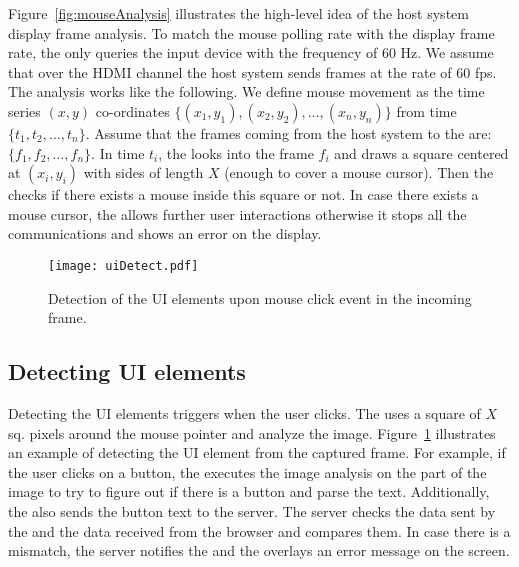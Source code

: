 Figure~\ref{fig:mouseAnalysis} illustrates the high-level idea of the host system display frame analysis. To match the mouse polling rate with the display frame rate, the \device only queries the input device with the frequency of $60$ Hz. We assume that over the HDMI channel the host system sends frames at the rate of $60$ fps. The analysis works like the following. We define mouse movement as the time series $(x,y)$ co-ordinates $\{(x_1,y_1), (x_2, y_2), \ldots, (x_n,y_n)\}$ from time $\{t_1, t_2, \ldots, t_n\}$. Assume that the frames coming from the host system to the \device are: $\{f_1, f_2, \ldots, f_n\}$. In time $t_i$, the \device looks into the frame $f_i$ and draws a square centered at $(x_i, y_i)$ with sides of length $X$ (enough to cover a mouse cursor). Then the \device checks if there exists a mouse inside this square or not. In case there exists a mouse cursor, the \device allows further user interactions otherwise it stops all the communications and shows an error on the display.

\begin{figure}[t]
\centering
\texttt{[image: uiDetect.pdf]}
\caption{Detection of the UI elements upon mouse click event in the incoming frame.}
\label{fig:uiDetect}
\centering
\end{figure}





\subsection{Detecting UI elements}
\label{sec:systemnDesign:uiElements}

Detecting the UI elements triggers when the user clicks. The \device uses a square of $X$ sq. pixels around the mouse pointer and analyze the image. Figure~\ref{fig:uiDetect} illustrates an example of detecting the UI element from the captured frame. For example, if the user clicks on a button, the \device executes the image analysis on the part of the image to try to figure out if there is a button and parse the text. Additionally, the \device also sends the button text to the server. The server checks the data sent by the \device and the data received from the browser and compares them. In case there is a mismatch, the server notifies the \device and the \device overlays an error message on the screen. 


